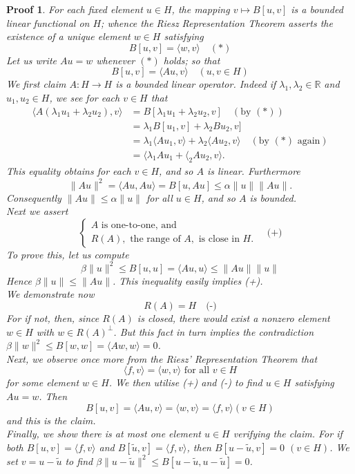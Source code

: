 \documentclass[14pt,a4paper]{scrartcl}
\newtheorem*{proof*}{Proof}
\numberwithin{equation}{section}
\newcommand{\R}{\mathbb{R}}
\begin{document}
\begin{proof*} %
	For each fixed element $u \in H$, the mapping $v \mapsto B[u, v]$ is a bounded linear functional on $H$; whence the Riesz Representation Theorem asserts the existence of a unique element $w \in H$ satisfying
		\[ B[u, v] = \langle w, v \rangle \quad (*) \]
	Let us write $A u = w$ whenever $(*)$ holds; so that
		\[ B[u, v] = \langle Au, v \rangle \quad (u, v \in H) \]
	We first claim $A \colon H \rightarrow H$ is a bounded linear operator. Indeed if $\lambda_{1}, \lambda_{2} \in \R$ and $u_{1}, u_{2} \in H$, we see for each $v \in H$ that
	\begin{align*}
		\langle A (\lambda_{1} u_{1} + \lambda_{2} u_{2}), v \rangle & = B[\lambda_{1} u_{1} + \lambda_{2} u_{2}, v] \quad (\text{by } (*)) \\
			& = \lambda_{1} B[u_{1}, v] + \lambda_{2} Bu_{2}, v] \\
			& = \lambda_{1} \langle A u_{1}, v \rangle + \lambda_{2} \langle A u_{2}, v \rangle  \quad (\text{by } (*) \text{ again}) \\
			& = \langle \lambda_{1} A u_{1} + \langle_{2} A u_{2}, v \rangle.
	\end{align*}
	This equality obtains for each $v \in H$, and so $A$ is linear. Furthermore
	\[ \| A u \|^{2} = \langle A u, A u \rangle = B[u, Au] \leq \alpha \| u \| \| Au \|. \]
	Consequently $\| A u \| \leq \alpha \|u \|$ for all $u \in H$, and so $A$ is bounded. \\
	Next we assert
	\[ \begin{cases} A \text{ is one-to-one, and} \\ R(A), \text{ the range of } A, \text{ is close in } H. \end{cases} \quad \text{(+)} \]
	To prove this, let us compute
		\[ \beta \| u \|^{2} \leq B[u, u] = \langle Au, u \rangle \leq \| Au \| \| u \| \]
	Hence $\beta \| u \| \leq \| Au \|$. This inequality easily implies (+). \\
	We demonstrate now
		\[ R(A) = H \quad \text{(-)} \]
		For if not, then, since $R(A)$ is closed, there would exist a nonzero element $w \in H$ with $w \in R(A)^{\bot}$. But this fact in turn implies the contradiction $\beta \| w \|^{2} \leq B[w, w] = \langle A w , w \rangle = 0$. \\
	Next, we observe once more from the Riesz' Representation Theorem that
		\[ \langle f, v \rangle = \langle w , v \rangle \text{ for all } v \in H \]
	for some element $w \in H$. We then utilise (+) and (-) to find $u \in H$ satisfying $A u  = w$. Then 
		\[ B[u, v] = \langle A u, v \rangle = \langle w, v \rangle = \langle f, v \rangle (v \in H) \]
	and this is the claim. \\
	Finally, we show there is at most one element $u \in H$ verifying the claim. For if both $B[u, v] = \langle f, v \rangle$ and $B[\tilde{u}, v] = \langle f, v \rangle$, then $B[u - \tilde{u}, v] = 0$ $(v \in H)$. We set $v = u - \tilde{u}$ to find $\beta \| u - \tilde{u}\|^{2} \leq B[u - \tilde{u}, u - \tilde{u}] = 0$.
\end{proof*}
\end{document}
